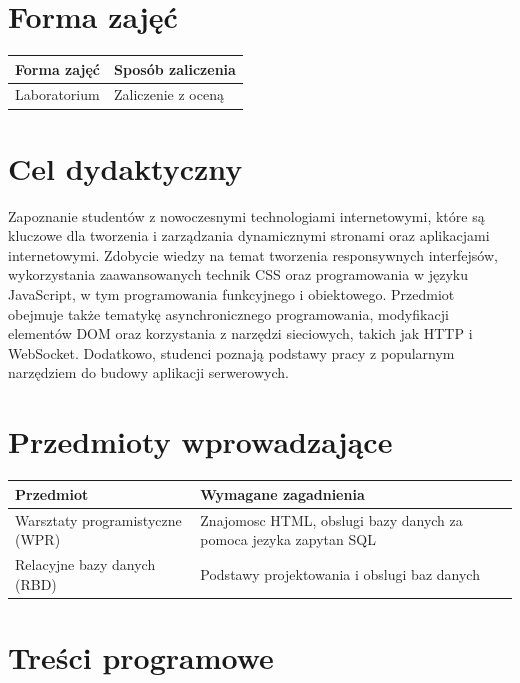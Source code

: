 \documentclass[12pt, a4paper]{article}
\begin{document}
\section{Forma zajęć}

\begin{tabular}{ll}
  \hline
  \textbf{Forma zajęć} & \textbf{Sposób zaliczenia} \\
  \hline
  Laboratorium & Zaliczenie z oceną \\
  \hline
\end{tabular}

\section{Cel dydaktyczny}

Zapoznanie studentów z nowoczesnymi technologiami internetowymi, które są kluczowe dla tworzenia i zarządzania dynamicznymi stronami oraz aplikacjami internetowymi. Zdobycie wiedzy na temat tworzenia responsywnych interfejsów, wykorzystania zaawansowanych technik CSS oraz programowania w języku JavaScript, w tym programowania funkcyjnego i obiektowego. Przedmiot obejmuje także tematykę asynchronicznego programowania, modyfikacji elementów DOM oraz korzystania z narzędzi sieciowych, takich jak HTTP i WebSocket. Dodatkowo, studenci poznają podstawy pracy z popularnym narzędziem do budowy aplikacji serwerowych.

\section{Przedmioty wprowadzające}

\begin{tabularx}{\textwidth}{lX}
  \hline
  \textbf{Przedmiot} & \textbf{Wymagane zagadnienia} \\
  \hline
  Warsztaty programistyczne (WPR) & Znajomosc HTML, obslugi bazy danych za pomoca jezyka zapytan SQL \\
  Relacyjne bazy danych (RBD) & Podstawy projektowania i obslugi baz danych \\
  \hline
\end{tabularx}

\section{Treści programowe}
\end{document}
